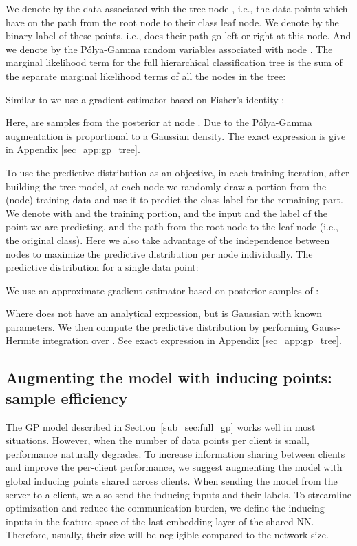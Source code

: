 \documentclass{article}
\def\Secref#1{Section~\ref{#1}}
\newcommand{\pg}{P\'olya-Gamma }
\begin{document}
We denote by  the data associated with the tree node , i.e., the data points which have  on the path from the root node to their class leaf node. We denote by  the binary label of these points, i.e., does their path go left or right at this node. And we denote by  the \pg random variables associated with node . The marginal likelihood term for the full hierarchical classification tree is the  sum of the separate marginal likelihood terms of all the nodes  in the tree:

Similar to \cite{snell2020bayesian} we use a gradient estimator based on Fisher's identity \cite{douc2014nonlinear}:

\iffalse

\fi
Here,  are samples from the posterior at node . Due to the \pg augmentation  is proportional to a Gaussian density. The exact expression is give in Appendix \ref{sec_app:gp_tree}.

To use the predictive distribution as an objective, in each training iteration, after building the tree model, at each node we randomly draw a portion from the (node) training data and use it to predict the class label for the remaining part. We denote with  and  the training portion,  and  the input and the label of the point we are predicting, and  the path from the root node to the  leaf node (i.e., the original class). Here we also take advantage of the independence between nodes to maximize the predictive distribution per node individually. The predictive distribution for a single data point: 

We use an approximate-gradient estimator based on posterior samples of :

\iffalse

\fi
Where  does not have an analytical expression, 
but  is Gaussian with known parameters. We then compute the predictive distribution by performing Gauss-Hermite integration over . See exact expression in Appendix \ref{sec_app:gp_tree}.

\subsection{Augmenting the model with inducing points: sample efficiency} \label{subsec_method:gp_IP-data}
The GP model described in \Secref{sub_sec:full_gp} works well in most situations. However, when the number of data points per client is small, performance naturally degrades. To increase information sharing between clients and improve the per-client performance, we suggest augmenting the model with global inducing points shared across clients. When sending the model from the server to a client, we also send the inducing inputs and their labels. To streamline optimization and reduce the communication burden, we define the inducing inputs in the feature space of the last embedding layer of the shared NN. Therefore, usually, their size will be negligible compared to the network size. 
\end{document}
